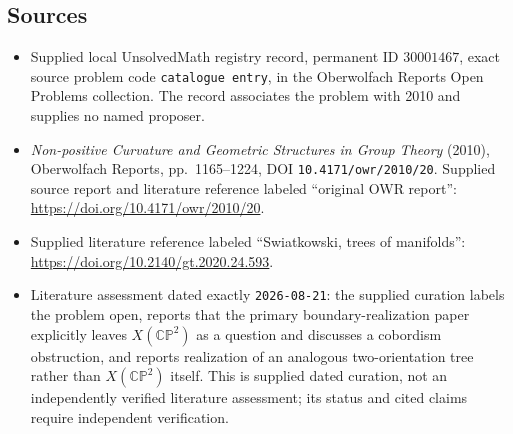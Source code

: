 \documentclass[11pt]{article}
\begin{document}
\subsection{Sources}
\begin{itemize}
\item Supplied local UnsolvedMath registry record, permanent ID \(30001467\), exact source problem code \texttt{catalogue entry}, in the Oberwolfach Reports Open Problems collection. The record associates the problem with 2010 and supplies no named proposer.
\item \emph{Non-positive Curvature and Geometric Structures in Group Theory} (2010), Oberwolfach Reports, pp.\ 1165--1224, DOI \texttt{10.4171/owr/2010/20}. Supplied source report and literature reference labeled ``original OWR report'': \url{https://doi.org/10.4171/owr/2010/20}.
\item Supplied literature reference labeled ``Swiatkowski, trees of manifolds'': \url{https://doi.org/10.2140/gt.2020.24.593}.
\item Literature assessment dated exactly \texttt{2026-08-21}: the supplied curation labels the problem open, reports that the primary boundary-realization paper explicitly leaves \(X(\mathbb{CP}^{2})\) as a question and discusses a cobordism obstruction, and reports realization of an analogous two-orientation tree rather than \(X(\mathbb{CP}^{2})\) itself. This is supplied dated curation, not an independently verified literature assessment; its status and cited claims require independent verification.
\end{itemize}
\end{document}
